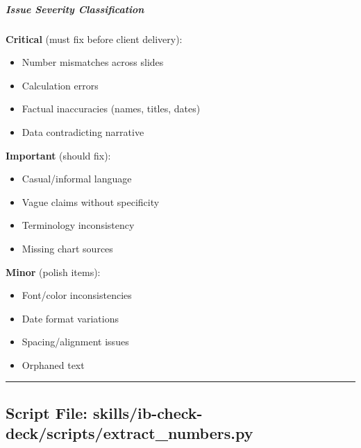 \documentclass[11pt]{article}
\begin{document}
\subparagraph{Issue Severity Classification}\mbox{}\par

\textbf{Critical} (must fix before client delivery):

\begin{itemize}[leftmargin=*,itemsep=2pt,topsep=2pt]
\item {} Number mismatches across slides
\item {} Calculation errors
\item {} Factual inaccuracies (names, titles, dates)
\item {} Data contradicting narrative
\end{itemize}

\textbf{Important} (should fix):

\begin{itemize}[leftmargin=*,itemsep=2pt,topsep=2pt]
\item {} Casual/informal language
\item {} Vague claims without specificity
\item {} Terminology inconsistency
\item {} Missing chart sources
\end{itemize}

\textbf{Minor} (polish items):

\begin{itemize}[leftmargin=*,itemsep=2pt,topsep=2pt]
\item {} Font/color inconsistencies
\item {} Date format variations
\item {} Spacing/alignment issues
\item {} Orphaned text
\end{itemize}

\vspace{0.8em}\hrule\vspace{0.8em}

\subsection{Script File: skills/ib-check-deck/scripts/extract\_\allowbreak{}numbers.py}\label{file:skills-ib-check-deck-scripts-extract-numbers-py}
\end{document}
